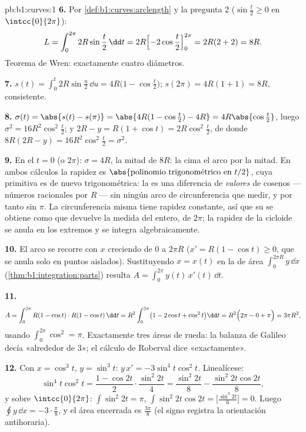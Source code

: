\begin{solution}{pb:b1:curves:1}
\textbf{6.} Por \cref{def:b1:curves:arclength} y la pregunta 2
($\sin\frac t2 \geq 0$ en $\intcc{0}{2\pi}$):
\[
L = \int_0^{2\pi} 2R\sin\frac t2\,\dd t
= 2R\Bigl[-2\cos\frac t2\Bigr]_0^{2\pi} = 2R(2 + 2) = 8R .
\]
Teorema de Wren: exactamente cuatro diámetros.

\textbf{7.} $s(t) = \int_0^t 2R\sin\frac u2\,\dd u =
4R\bigl(1 - \cos\frac t2\bigr)$; $s(2\pi) = 4R(1+1) = 8R$,
consistente.

\textbf{8.} $\sigma(t) = \abs{s(t) - s(\pi)} = \abs{4R(1 -
\cos\frac t2) - 4R} = 4R\abs{\cos\frac t2}$, luego $\sigma^2 =
16R^2\cos^2\frac t2$; y $2R - y = R(1 + \cos t) =
2R\cos^2\frac t2$, de donde $8R(2R - y) = 16R^2\cos^2\frac t2 =
\sigma^2$.

\textbf{9.} En el  $t = 0$ (o $2\pi$): $\sigma = 4R$, la mitad
de $8R$: la cima  el arco por la mitad. En ambos cálculos la
rapidez es $\abs{\text{polinomio trigonométrico en } t/2}$, cuya
primitiva es de nuevo trigonométrica: la  es una
diferencia de \emph{valores} de cosenos --- números racionales
por $R$ --- sin ningún arco de circunferencia que medir, y por tanto sin $\pi$.
La circunferencia misma tiene rapidez constante, así que su  se obtiene como 
que devuelve la medida del  entero, de  $2\pi$; la rapidez de la cicloide
se anula en los extremos y se integra algebraicamente.

\textbf{10.} El arco se recorre con $x$ creciendo de $0$ a
$2\pi R$ ($x' = R(1 - \cos t) \geq 0$, que se anula solo en
puntos aislados). Sustituyendo $x = x(t)$ en la  de área
$\int_0^{2\pi R} y\,\dd x$ (\cref{thm:b1:integration:parts})
resulta $A = \int_0^{2\pi} y(t)\,x'(t)\,\dd t$.

\textbf{11.}
\[
A = \int_0^{2\pi} R(1 - \cos t)\cdot R(1 - \cos t)\,\dd t
= R^2\int_0^{2\pi}\bigl(1 - 2\cos t + \cos^2 t\bigr)\dd t
= R^2\Bigl(2\pi - 0 + \pi\Bigr) = 3\pi R^2 ,
\]
usando $\int_0^{2\pi}\cos^2 = \pi$. Exactamente tres áreas de rueda:
la balanza de Galileo decía «alrededor de $3$»; el cálculo de Roberval
dice «exactamente».

\textbf{12.} Con $x = \cos^3 t$, $y = \sin^3 t$: $y\,x' =
-3\sin^4 t\cos^2 t$. Linealícese:
\[
\sin^4 t\cos^2 t = \frac{1 - \cos 2t}{2}\cdot\frac{\sin^2
2t}{4} = \frac{\sin^2 2t}{8} - \frac{\sin^2 2t\cos 2t}{8} ,
\]
y sobre $\intcc{0}{2\pi}$: $\int\sin^2 2t = \pi$, $\int \sin^2
2t\cos 2t = \bigl[\frac{\sin^3 2t}{6}\bigr] = 0$. Luego $\oint
y\,\dd x = -3\cdot\frac\pi8$, y el área encerrada es
$\frac{3\pi}8$ (el signo registra la orientación
antihoraria).


\end{solution}
